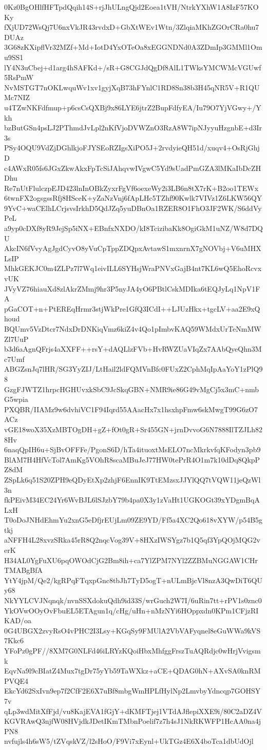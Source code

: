 0Kz0BgOHlfHFTpdQqih14S+rjJhULngQjd2Eoea1tVH/NtrkYXhW1A8IzF57KOKy
fXjUD72WsQj7U6nxVkJR43rvdxD+GbXtWEv1Wtn/3ZlqiaMKhZGOrCRa0hu7DUAz
3G68zKXipflVr32MZf+Md+IotD4YxOTeOa8xEGGNDNd0A3ZDmIp3GMMl1Omu9SS1
lY4N3uCbej+d1arg4hSAFKd+/sR+G8CGJdQgDf8AlL1TWksYMCWMcVGUwf5RsPmW
NvMSTGT7nOKLwquWv1xv1gyjXqB73hFYnlC1RD8Sn38b3H45qNR5V+R1QUMc7NIZ
u4TZwNKFdfmup+p6csCsQXBj9x86LYE6jtrZ2BupFdfyEA/Iu79O7YjVGwy+/Ykh
bzButGSn4psLJ2PThmdJvLpl2nKfVjoDVWZnO3RzA8W7ipNJyyuHzgnbE+d3Ir3s
PSy4OQU9VdZjDGhlkjoFJYSEoRZIgsXiPO5J+2rvdyieQH51d/xuqv4+OsRjGhjD
c4AWxR05fs6JGxZkwAkxFpTcSiJAhqvwIVgwC5Yd9sUadPmGZA3lMKaIbDcZHDhu
Re7nUtFlulczpEJD423lnInOBkZyxrFgVf6oexeWy2i3LB6n8tX7rK+B2oo1TEWx
6twnFX2ogsgssRfj8HSceK+yZaNzVnj6fApLHc5TZhf90Kwlk7VIVz1Z6LKW56QY
9YvC+waCElhLCrjsvsIrkhD5QdJZq5yuDBnOa1RZER8O1FhO3JF2WK/S6ddVyPeL
a9yp0cDXf8yR9JejSp5iNX+EBnfxNXDO/kI8TcizibaKk8OgiGkM1uNZ/W8d7DQU
AkcIN6fVvyAgJgdCyvO8yVuCpTppZDQpxAvtawS1mxnrnX7gNOVbj+V6uMHXLsIP
MhkGEKJC0m4ZLPz7l7Wq1eivILL6SYHsjWraPNVxGajB4nt7KL6wQ5EhoRcvxvUK
JVyVZ76hiauXd8zlAkrZMmj9hr3P5nyJA4yO6PBtlCskMDIka6tEQJyLq1NpV1FA
pGaCOT+n+PtEREqHrmr3stjWkPre1GfQ3ICdI++LJUzHkx+tgcLV+aa2E9xQhoud
BQUmv5VzDtcr7NdxDrDNKiqVmz6kiZ4v4Qo1pImbvKAQ59WMdxUrTeNmMWZl7UuP
b3d6aAgnQFrjs4aXXFF++rsY+dAQLlzFVb+HvRWZUaVIqZx7AAbQyeQhn3Mc7Umf
ABGZsnJq7lHR/SG3YyZIJ/LtHail2ldFQMVnBfc0FUxZ2CphMqIpAaYoY1zPlQ98
GzgFJWTZ1hrpcHGHUvxkSbC9JcSkqGBN+NMR9ie86G49vMgCj5x3mC+nmbG5wpia
PXQBR/IIAMz9w6dvhiVC1F94Iqrd55AAacHx7x1hsxhpFmw6skMwgT99G6zO7ACz
vGE18woX35XzMBTOgDH+gZ+fOt0gR+Sr455GN+jrnDvvoG6N7888IlTZJLh828Hv
6naqQpIH6u+SjBvOFFFe/PgonS6D/hTa4ituoxtMsELO7ncMkrkvfqKFodyn3pb9
BlAM7H4HfVcTol7AmKg5VOhR8scaMBuJeJ77HW0tePrR4O1m7k10dDq8QkpPZ8dM
ZSpLk6q51S20ZPH9eQDyEtXp2zhjF6EnnIK9TtEMzsxJJYlQQ7tVQW11jeQzWl3n
fkPEivM34EC24Yr6WvBJL6lSJzbY79b4pa0X3y1zVaHt1UGKOGt39xYDgmBqALxH
T0oDoJNHdEhmYu2xnG5eDfjrEUjLm09ZE9YD/Ff5a4XC2Qo618vXYW/p54B5gtkj
aNFFH4L28xvzSRka45rR8Q2nqcVog39V+8HXzIWSYgz7b1Q5qf3YpQOjMQG2verK
H34AL0YgFuXU6pqOWOdCjG2Bm8ih+ca7YlZPM7NYl2ZZBMuNGGAW1CHrTMABgBfA
YtY4jpM/Qe2/kgRPqFTqxpGnc8tbJh7TyD5ogT+nULmBjcVl8nzA3QwDiT6QUy68
NkYYLCVJNqnqk/nvnSSXdokuQdh9id33S/wrGuch2W7I/6uRin7tt+rPV1s0znc0
YkOVwOOyOvFbuEL5ETAgun1q/cHg/uHn+nMzNYi6HOppxdn0KPm1CFjzRIKAD/oa
0G4UBGX2zvyRsO4vPHC2I3Lsy+KGqSy9FMUlA2VbVAFyqnel8eGuWWa9kVS7Kkc6
YFoPz0gPF//8XM7G0NLFd46iLRYzKQoiHbxMhfggFrszTuAQRdjc0wHrjVvigsmk
EqvNa9l9cBIatZ4Mux7tgDr75yYb59TaWXkz+aCE+QDAG0hN+AXvSA0knRMPVQE4
EkcYd62SxIvn9ep7f2CfF2E6X7uBf8mbgWmHPLfHylNp2LmvbyYdncqp7GOHSY7v
qLp3wdMitXfFjd/vu8KajEVA1fGjY+dKMFTjej1VTdAJflepiXXE9i/80C2aDZ4V
KGVRAwQ3njfW08HVjdkJDetIKmTMbnPoelif7z7h4sJ1NkRKWFP1HcAA0na4jPN8
nvfujls4h6sW5/tZVqskVZ/l2sHoO/F9Vi7xEynl+UkTGz4E6X4boTca1dbUdOjl
